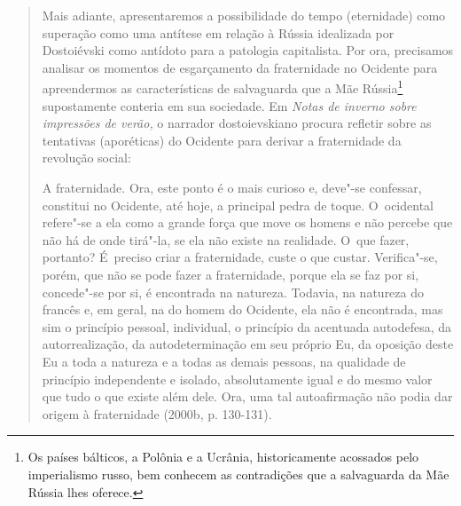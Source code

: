 {\begin{quote}
Mais adiante, apresentaremos a possibilidade do tempo (eternidade) como
superação como uma antítese em relação à Rússia idealizada por
Dostoiévski como antídoto para a patologia capitalista. Por ora,
precisamos analisar os momentos de esgarçamento da fraternidade no
Ocidente para apreendermos as características de salvaguarda que a Mãe
Rússia\footnote{Os países bálticos, a Polônia e a Ucrânia,
  historicamente acossados pelo imperialismo russo, bem conhecem as
  contradições que a salvaguarda da Mãe Rússia lhes oferece.}
supostamente conteria em sua sociedade. Em \emph{Notas de inverno sobre
impressões de verão,} o narrador dostoievskiano procura refletir sobre
as tentativas (aporéticas) do Ocidente para derivar a fraternidade da
revolução social:

A fraternidade. Ora, este ponto é o mais curioso e, deve"-se confessar,
constitui no Ocidente, até hoje, a principal pedra de toque. O~ocidental
refere"-se a ela como a grande força que move os homens e não percebe que
não há de onde tirá"-la, se ela não existe na realidade. O~que fazer,
portanto? É~preciso criar a fraternidade, custe o que custar.
Verifica"-se, porém, que não se pode fazer a fraternidade, porque ela se
faz por si, concede"-se por si, é encontrada na natureza. Todavia, na
natureza do francês e, em geral, na do homem do Ocidente, ela não é
encontrada, mas sim o princípio pessoal, individual, o princípio da
acentuada autodefesa, da autorrealização, da autodeterminação em seu
próprio Eu, da oposição deste Eu a toda a natureza e a todas as demais
pessoas, na qualidade de princípio independente e isolado, absolutamente
igual e do mesmo valor que tudo o que existe além dele. Ora, uma tal
autoafirmação não podia dar origem à fraternidade (2000b, p. 130-131).


\end{quote}}
